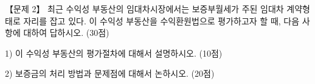 \begin{longquestion}{【문제 2】}
최근 수익성 부동산의 임대차시장에서는 보증부월세가 주된 임대차 계약형태로 자리를 잡고 있다. 이 수익성 부동산을 수익환원법으로 평가하고자 할 때, 다음 사항에 대하여 답하시오. (30점) \par
1) 이 수익성 부동산의 평가절차에 대해서 설명하시오. (10점) \par
2) 보증금의 처리 방법과 문제점에 대해서 논하시오. (20점) \par
\end{longquestion}
